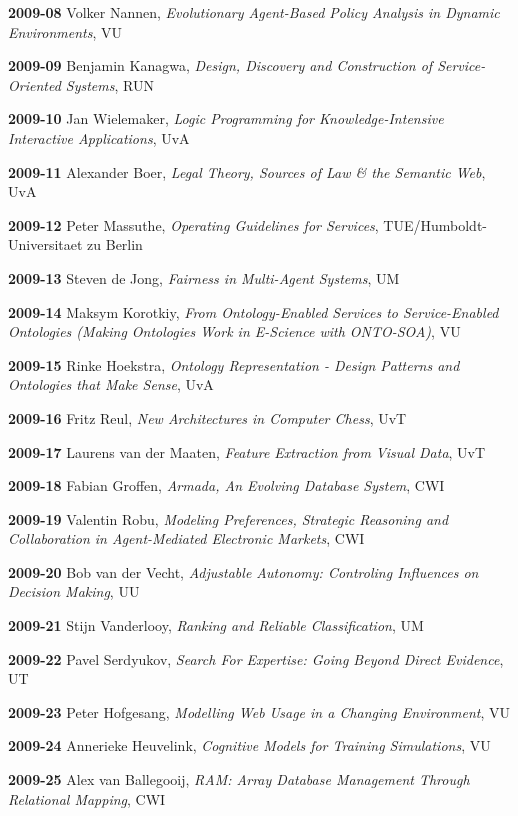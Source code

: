 \begin{multicols}{2}
\textbf{2009-08}   Volker Nannen, \textit{Evolutionary Agent-Based Policy Analysis in Dynamic Environments}, VU

\textbf{2009-09}   Benjamin Kanagwa, \textit{Design, Discovery and Construction of Service-Oriented Systems}, RUN

\textbf{2009-10}   Jan Wielemaker, \textit{Logic Programming for Knowledge-Intensive Interactive Applications}, UvA

\textbf{2009-11}   Alexander Boer, \textit{Legal Theory, Sources of Law \& the Semantic Web}, UvA

\textbf{2009-12}   Peter Massuthe, \textit{Operating Guidelines for Services}, TUE/Humboldt-Universitaet zu Berlin

\textbf{2009-13}   Steven de Jong, \textit{Fairness in Multi-Agent Systems}, UM

\textbf{2009-14}   Maksym Korotkiy, \textit{From Ontology-Enabled Services to Service-Enabled Ontologies (Making Ontologies Work in E-Science with ONTO-SOA)}, VU

\textbf{2009-15}   Rinke Hoekstra, \textit{Ontology Representation - Design Patterns and Ontologies that Make Sense}, UvA

\textbf{2009-16}   Fritz Reul, \textit{New Architectures in Computer Chess}, UvT

\textbf{2009-17}   Laurens van der Maaten, \textit{Feature Extraction from Visual Data}, UvT

\textbf{2009-18}   Fabian Groffen, \textit{Armada, An Evolving Database System}, CWI

\textbf{2009-19}   Valentin Robu, \textit{Modeling Preferences, Strategic Reasoning and Collaboration in Agent-Mediated Electronic Markets}, CWI

\textbf{2009-20}   Bob van der Vecht, \textit{Adjustable Autonomy: Controling Influences on Decision Making}, UU

\textbf{2009-21}   Stijn Vanderlooy, \textit{Ranking and Reliable Classification}, UM

\textbf{2009-22}   Pavel Serdyukov, \textit{Search For Expertise: Going Beyond Direct Evidence}, UT

\textbf{2009-23}   Peter Hofgesang, \textit{Modelling Web Usage in a Changing Environment}, VU

\textbf{2009-24}   Annerieke Heuvelink, \textit{Cognitive Models for Training Simulations}, VU

\textbf{2009-25}   Alex van Ballegooij, \textit{RAM: Array Database Management Through Relational Mapping}, CWI


\end{multicols}
